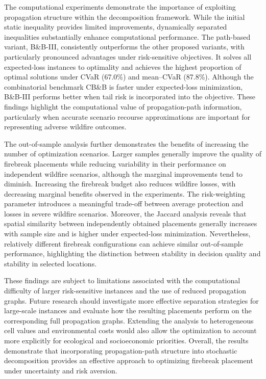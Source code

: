 \documentclass{itor}
\begin{document}
The computational experiments demonstrate the importance of exploiting
propagation structure within the decomposition framework. While the
initial static inequality provides limited improvements, dynamically
separated inequalities substantially enhance computational performance.
The path-based variant, B\&B-III, consistently outperforms the other
proposed variants, with particularly pronounced advantages under
risk-sensitive objectives. It solves all expected-loss instances to
optimality and achieves the highest proportion of optimal solutions
under CVaR (67.0\%) and mean--CVaR (87.8\%). Although the combinatorial
benchmark CB\&B is faster under expected-loss minimization, B\&B-III
performs better when tail risk is incorporated into the objective.
These findings highlight the computational value of propagation-path
information, particularly when accurate scenario recourse approximations
are important for representing adverse wildfire outcomes.

The out-of-sample analysis further demonstrates the benefits of
increasing the number of optimization scenarios. Larger samples generally
improve the quality of firebreak placements while reducing variability
in their performance on independent wildfire scenarios, although
the marginal improvements tend to diminish. Increasing the firebreak
budget also reduces wildfire losses, with decreasing marginal benefits
observed in the experiments. The risk-weighting parameter introduces
a meaningful trade-off between average protection and losses in severe
wildfire scenarios. Moreover, the Jaccard analysis reveals that spatial
similarity between independently obtained placements generally increases
with sample size and is higher under expected-loss minimization.
Nevertheless, relatively different firebreak configurations can achieve
similar out-of-sample performance, highlighting the distinction between
stability in decision quality and stability in selected locations.

These findings are subject to limitations associated with the
computational difficulty of larger risk-sensitive instances and the
use of reduced propagation graphs. Future research should investigate
more effective separation strategies for large-scale instances and
evaluate how the resulting placements perform on the corresponding
full propagation graphs. Extending the analysis to heterogeneous
cell values and environmental costs would also allow the optimization
to account more explicitly for ecological and socioeconomic priorities.
Overall, the results demonstrate that incorporating propagation-path
structure into stochastic decomposition provides an effective approach
to optimizing firebreak placement under uncertainty and risk aversion.
\end{document}
